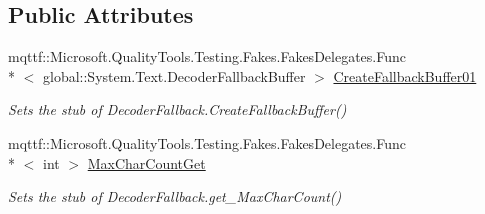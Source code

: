 \subsection*{Public Attributes}
\begin{DoxyCompactItemize}
\item 
mqttf\-::\-Microsoft.\-Quality\-Tools.\-Testing.\-Fakes.\-Fakes\-Delegates.\-Func\\*
$<$ global\-::\-System.\-Text.\-Decoder\-Fallback\-Buffer $>$ \hyperlink{class_system_1_1_text_1_1_fakes_1_1_stub_decoder_fallback_a6cba5d9313a6014ab195efdad14b6c36}{Create\-Fallback\-Buffer01}
\begin{DoxyCompactList}\small\item\em Sets the stub of Decoder\-Fallback.\-Create\-Fallback\-Buffer()\end{DoxyCompactList}\item 
mqttf\-::\-Microsoft.\-Quality\-Tools.\-Testing.\-Fakes.\-Fakes\-Delegates.\-Func\\*
$<$ int $>$ \hyperlink{class_system_1_1_text_1_1_fakes_1_1_stub_decoder_fallback_a8115bd5d92356ca66a07b7d906189111}{Max\-Char\-Count\-Get}
\begin{DoxyCompactList}\small\item\em Sets the stub of Decoder\-Fallback.\-get\-\_\-\-Max\-Char\-Count()\end{DoxyCompactList}\end{DoxyCompactItemize}
